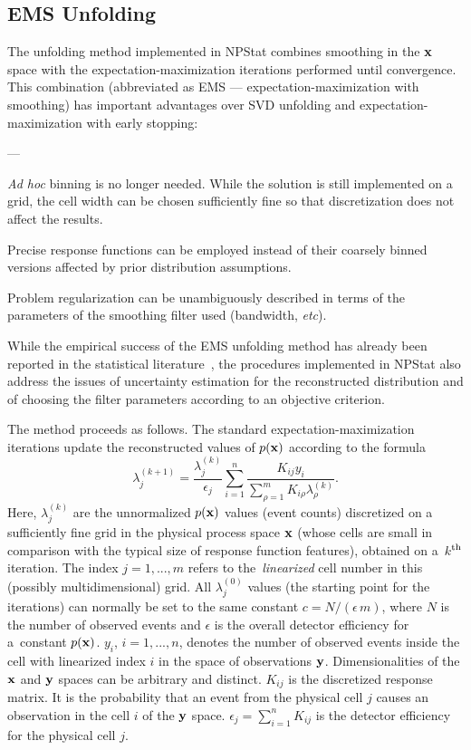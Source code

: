 \documentclass[12pt,titlepage]{article}
\newcommand{\supers}[1]{\ensuremath{^{\mbox{\scriptsize #1}}}}
\newenvironment{thinlist} {
    \begin{list} {---} {
        \setlength{\topsep}{0.075cm}
        \setlength{\parsep}{0.075cm}
        \setlength{\itemsep}{0.075cm}
    }
} {\end{list}}
\begin{document}
\subsection{EMS Unfolding}

The unfolding method implemented in NPStat combines smoothing in the
${\bf x}$ space with the expectation-maximization iterations performed
until convergence.
This combination (abbreviated
as EMS --- expectation-maximization with smoothing)
has important advantages over SVD unfolding and
expectation-maximization with early stopping:
\begin{thinlist}
\item{{\it Ad hoc} binning is no longer needed. While the solution is
      still implemented on a grid, the cell width
      can be chosen sufficiently fine
      so that discretization does not affect the results.}
\item{Precise response functions can be employed instead of their
      coarsely binned versions affected by prior distribution
      assumptions.}
\item{Problem regularization can be unambiguously described in terms of the
      parameters of the smoothing filter used (bandwidth, {\it etc}).}
\end{thinlist}
While the empirical success of the EMS unfolding method
has already been reported in the statistical
literature~\cite{ref:nychka, ref:smoothedem, ref:dagounfold},
the procedures implemented in NPStat also address the issues
of uncertainty estimation for the reconstructed distribution and of
choosing the filter parameters according to an objective
criterion. 

The method proceeds as follows. The standard expectation-maximization
iterations update the reconstructed values of $p({\bf x})$ according to the formula~\cite{ref:nychka, ref:smoothedem}
\begin{equation}
    \lambda_j^{(k+1)} = \frac{\lambda_j^{(k)}}{\epsilon_j} \sum_{i=1}^{n} \frac{K_{ij} y_i}{\sum_{\rho=1}^{m} K_{i\rho} \lambda_{\rho}^{(k)}}.
\end{equation}
Here, $\lambda_j^{(k)}$ are the unnormalized $p({\bf x})$ values
(event counts) discretized on a sufficiently fine grid
in the physical process space ${\bf x}$
(whose cells are small in comparison with the typical size of response function
features), obtained on a~$k$\supers{th} iteration. The index $j = 1, ..., m$ refers to
the~{\it linearized} cell number in this (possibly multidimensional) grid.
All $\lambda_j^{(0)}$ values (the starting point for the iterations) can normally
be set to the same constant $c = N/(\epsilon \, m)$, where $N$ is the
number of observed events and $\epsilon$ is the overall detector efficiency
for a~constant $p({\bf x})$. $y_i$, $i = 1, ..., n$, denotes the number
of observed events inside the cell with linearized index $i$ in the space
of observations ${\bf y}$. Dimensionalities of the ${\bf x}$ and ${\bf y}$
spaces can be arbitrary and distinct. $K_{ij}$ is the discretized response
matrix. It is the probability that
an event from the physical cell $j$ causes an observation in the cell
$i$ of the ${\bf y}$ space. $\epsilon_j = \sum_{i=1}^{n} K_{ij}$ is the
detector efficiency for the physical cell $j$.
\end{document}
